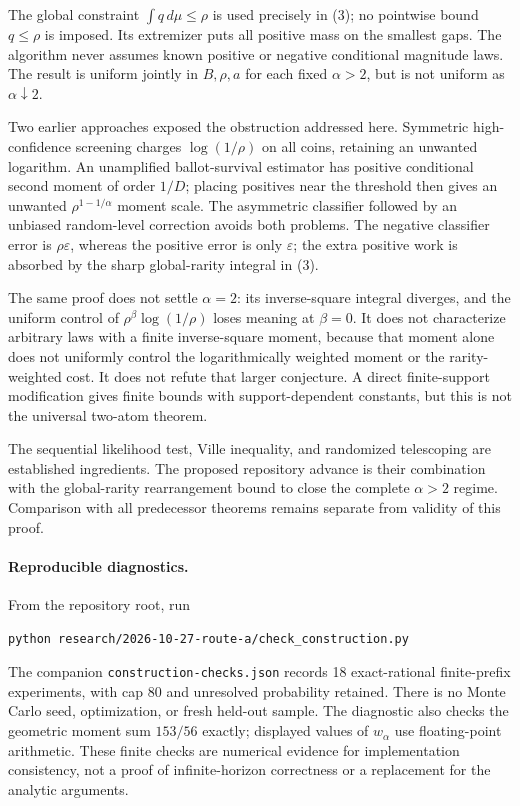 \documentclass[11pt]{article}
\begin{document}
The global constraint $\int q\,d\mu\le\rho$ is used precisely in (3); no
pointwise bound $q\le\rho$ is imposed. Its extremizer puts all positive mass
on the smallest gaps. The algorithm never assumes known positive or negative
conditional magnitude laws. The result is uniform jointly in $B,\rho,a$ for
each fixed $\alpha>2$, but is not uniform as $\alpha\downarrow2$.

Two earlier approaches exposed the obstruction addressed here. Symmetric
high-confidence screening charges $\log(1/\rho)$ on all coins, retaining an
unwanted logarithm. An unamplified ballot-survival estimator has positive
conditional second moment of order $1/D$; placing positives near the threshold
then gives an unwanted $\rho^{1-1/\alpha}$ moment scale. The asymmetric
classifier followed by an unbiased random-level correction avoids both
problems. The negative classifier error is $\rho\varepsilon$, whereas the
positive error is only $\varepsilon$; the extra positive work is absorbed by
the sharp global-rarity integral in (3).

The same proof does not settle $\alpha=2$: its inverse-square integral diverges,
and the uniform control of $\rho^\beta\log(1/\rho)$ loses meaning at $\beta=0$.
It does not characterize arbitrary laws with a finite inverse-square moment,
because that moment alone does not uniformly control the logarithmically
weighted moment or the rarity-weighted cost. It does not refute that larger
conjecture. A direct finite-support modification gives finite bounds with
support-dependent constants, but this is not the universal two-atom theorem.

The sequential likelihood test, Ville inequality, and randomized telescoping
are established ingredients. The proposed repository advance is their
combination with the global-rarity rearrangement bound to close the complete
$\alpha>2$ regime. Comparison with all predecessor theorems remains separate
from validity of this proof.

\paragraph{Reproducible diagnostics.}
From the repository root, run
\begin{verbatim}
python research/2026-10-27-route-a/check_construction.py
\end{verbatim}
The companion \texttt{construction-checks.json} records 18 exact-rational
finite-prefix experiments, with cap 80 and unresolved probability retained.
There is no Monte Carlo seed, optimization, or fresh held-out sample.
The diagnostic also checks the geometric moment sum $153/56$ exactly;
displayed values of $w_\alpha$ use floating-point arithmetic. These finite
checks are numerical evidence for implementation consistency, not a proof
of infinite-horizon correctness or a replacement for the analytic arguments.
\end{document}
